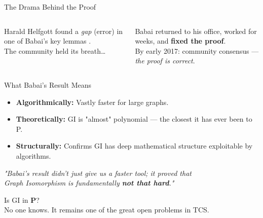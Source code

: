 \documentclass[10pt, aspectratio=169]{beamer}
\newcommand{\faExclamationTriangle}{$\triangle$}
\newcommand{\faCheckCircle}{$\checkmark$}
\newcommand{\faTrophy}{$\blacktriangle$}
\begin{document}
\begin{frame}{The \alert{Drama} Behind the Proof}
	\begin{columns}[T]
		\begin{tcolorbox}[keybox, title={\faExclamationTriangle\; The Gap (Jan 2017)}]
			Harald Helfgott found a \textit{gap} (error) in one of Babai's key lemmas \cite{Helfgott2017}.\\[0.3em]
			The community held its breath\ldots
		\end{tcolorbox}

		\vspace{0.5em}
		\begin{tcolorbox}[greenbox, title={\faCheckCircle\; The Fix (Feb 2017)}]
			Babai returned to his office, worked for weeks, and \textbf{fixed the proof}.\\[0.3em]
			By early 2017: community consensus — \textit{the proof is correct}.
		\end{tcolorbox}

	\end{columns}
\end{frame}

\begin{frame}{What Babai's Result \alert{Means}}
	\begin{tcolorbox}[keybox, title={\faTrophy\; Impact}]
		\begin{itemize}
			\item \textbf{Algorithmically:} Vastly faster for large graphs.
			\item \textbf{Theoretically:} GI is "almost" polynomial — the closest it has ever been to P.
			\item \textbf{Structurally:} Confirms GI has deep mathematical structure exploitable by algorithms.
		\end{itemize}
	\end{tcolorbox}

	\vspace{0.5em}
	\begin{tcolorbox}[greenbox]
		\centering
		\textit{"Babai's result didn't just give us a faster tool; it proved that\\
			Graph Isomorphism is fundamentally \textbf{not that hard}."}
	\end{tcolorbox}

	\vspace{0.4em}
	\begin{tcolorbox}[defbox, title={Open Question (Still!)}]
		Is GI in \textbf{P}? \\
		No one knows. It remains one of the great open problems in TCS.
	\end{tcolorbox}
\end{frame}
\end{document}
